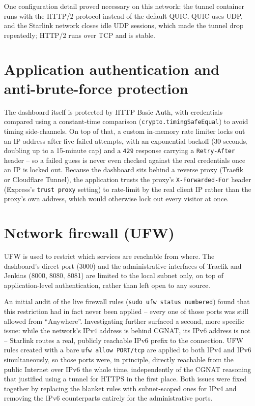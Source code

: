 One configuration detail proved necessary on this network: the tunnel container runs with the HTTP/2 protocol instead of the default QUIC. QUIC uses UDP, and the Starlink network closes idle UDP sessions, which made the tunnel drop repeatedly; HTTP/2 runs over TCP and is stable.

\section{Application authentication and anti-brute-force protection}
The dashboard itself is protected by HTTP Basic Auth, with credentials compared using a constant-time comparison (\texttt{crypto.timingSafeEqual}) to avoid timing side-channels. On top of that, a custom in-memory rate limiter locks out an IP address after five failed attempts, with an exponential backoff (30 seconds, doubling up to a 15-minute cap) and a \texttt{429} response carrying a \texttt{Retry-After} header -- so a failed guess is never even checked against the real credentials once an IP is locked out. Because the dashboard sits behind a reverse proxy (Traefik or Cloudflare Tunnel), the application trusts the proxy's \texttt{X-Forwarded-For} header (Express's \texttt{trust proxy} setting) to rate-limit by the real client IP rather than the proxy's own address, which would otherwise lock out every visitor at once.

\section{Network firewall (UFW)}
UFW is used to restrict which services are reachable from where. The dashboard's direct port (3000) and the administrative interfaces of Traefik and Jenkins (8000, 8080, 8081) are limited to the local subnet only, on top of application-level authentication, rather than left open to any source.

An initial audit of the live firewall rules (\texttt{sudo ufw status numbered}) found that this restriction had in fact never been applied -- every one of those ports was still allowed from ``Anywhere''. Investigating further surfaced a second, more specific issue: while the network's IPv4 address is behind CGNAT, its IPv6 address is not -- Starlink routes a real, publicly reachable IPv6 prefix to the connection. UFW rules created with a bare \texttt{ufw allow PORT/tcp} are applied to both IPv4 and IPv6 simultaneously, so those ports were, in principle, directly reachable from the public Internet over IPv6 the whole time, independently of the CGNAT reasoning that justified using a tunnel for HTTPS in the first place. Both issues were fixed together by replacing the blanket rules with subnet-scoped ones for IPv4 and removing the IPv6 counterparts entirely for the administrative ports.

